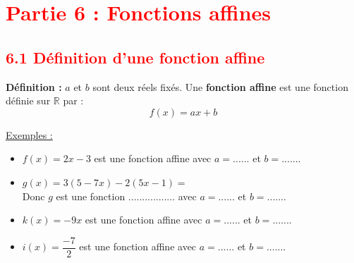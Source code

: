 \documentclass[12pt]{article}
\begin{document}



\section*{\textcolor{red}{Partie 6 : Fonctions affines}}

\subsection*{\textcolor{red}{6.1 Définition d'une fonction affine}}

\vspace{5pt}

\begin{mdframed}[
    linewidth=1pt,
    roundcorner=5pt,
    linecolor=ForestGreen
]
{\color{ForestGreen}\textbf{Définition :}}
$a$ et $b$ sont deux réels fixés. Une \textbf{fonction affine}
est une fonction définie sur $\mathbb{R}$ par :
\[
f(x) = ax + b
\]
\end{mdframed}

\underline{Exemples :}
\vspace{5pt}
\begin{itemize}
    \item $f(x) = 2x - 3$ est une fonction affine avec $a = ......$ et $b = ......$.
    \vspace{10pt}
    \item $g(x) = 3(5 - 7x) - 2(5x - 1) = $
    \dotfill
    \vspace{10pt}
    \\Donc $g$ est une fonction ................. avec $a = ......$ et $b = ......$.
    \vspace{10pt}
    \item $k(x) = -9x$ est une fonction affine avec $a = ......$ et $b = ......$.
    \vspace{10pt}
    \item $i(x) = \dfrac{-7}{2}$ est une fonction affine avec $a = ......$ et $b = ......$.
\end{itemize}
\end{document}
